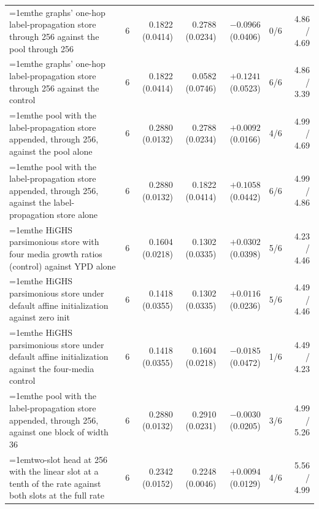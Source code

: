 \begin{table}[H]
\begin{tabular}{@{}>{\raggedright\hangindent=1em\hangafter=1\arraybackslash}p{78.5mm}rrrrrr@{}}
    the graphs' one-hop label-propagation store through 256 against the pool through 256 & 6 & 0.1822 (0.0414) & 0.2788 (0.0234) & $-0.0966$ (0.0406) & 0/6 & 4.86 / 4.69 \\
    the graphs' one-hop label-propagation store through 256 against the control & 6 & 0.1822 (0.0414) & 0.0582 (0.0746) & $+0.1241$ (0.0523) & 6/6 & 4.86 / 3.39 \\
    the pool with the label-propagation store appended, through 256, against the pool alone & 6 & 0.2880 (0.0132) & 0.2788 (0.0234) & $+0.0092$ (0.0166) & 4/6 & 4.99 / 4.69 \\
    the pool with the label-propagation store appended, through 256, against the label-propagation store alone & 6 & 0.2880 (0.0132) & 0.1822 (0.0414) & $+0.1058$ (0.0442) & 6/6 & 4.99 / 4.86 \\
    the HiGHS parsimonious store with four media growth ratios (control) against YPD alone & 6 & 0.1604 (0.0218) & 0.1302 (0.0335) & $+0.0302$ (0.0398) & 5/6 & 4.23 / 4.46 \\
    the HiGHS parsimonious store under default affine initialization against zero init & 6 & 0.1418 (0.0355) & 0.1302 (0.0335) & $+0.0116$ (0.0236) & 5/6 & 4.49 / 4.46 \\
    the HiGHS parsimonious store under default affine initialization against the four-media control & 6 & 0.1418 (0.0355) & 0.1604 (0.0218) & $-0.0185$ (0.0472) & 1/6 & 4.49 / 4.23 \\
    the pool with the label-propagation store appended, through 256, against one block of width 36 & 6 & 0.2880 (0.0132) & 0.2910 (0.0231) & $-0.0030$ (0.0205) & 3/6 & 4.99 / 5.26 \\
    two-slot head at 256 with the linear slot at a tenth of the rate against both slots at the full rate & 6 & 0.2342 (0.0152) & 0.2248 (0.0046) & $+0.0094$ (0.0129) & 4/6 & 5.56 / 4.99 \\
    \hline
  \end{tabular}
\end{table}

